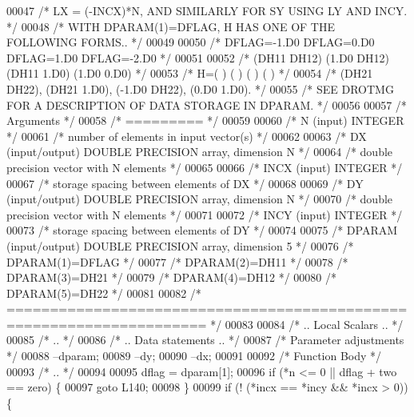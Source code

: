 \begin{DoxyCode}
00047 \textcolor{comment}{/*     LX = (-INCX)*N, AND SIMILARLY FOR SY USING LY AND INCY. */}
00048 \textcolor{comment}{/*     WITH DPARAM(1)=DFLAG, H HAS ONE OF THE FOLLOWING FORMS.. */}
00049 
00050 \textcolor{comment}{/*     DFLAG=-1.D0     DFLAG=0.D0        DFLAG=1.D0     DFLAG=-2.D0 */}
00051 
00052 \textcolor{comment}{/*       (DH11  DH12)    (1.D0  DH12)    (DH11  1.D0)    (1.D0  0.D0) */}
00053 \textcolor{comment}{/*     H=(          )    (          )    (          )    (          ) */}
00054 \textcolor{comment}{/*       (DH21  DH22),   (DH21  1.D0),   (-1.D0 DH22),   (0.D0  1.D0). */}
00055 \textcolor{comment}{/*     SEE DROTMG FOR A DESCRIPTION OF DATA STORAGE IN DPARAM. */}
00056 
00057 \textcolor{comment}{/*  Arguments */}
00058 \textcolor{comment}{/*  ========= */}
00059 
00060 \textcolor{comment}{/*  N      (input) INTEGER */}
00061 \textcolor{comment}{/*         number of elements in input vector(s) */}
00062 
00063 \textcolor{comment}{/*  DX     (input/output) DOUBLE PRECISION array, dimension N */}
00064 \textcolor{comment}{/*         double precision vector with N elements */}
00065 
00066 \textcolor{comment}{/*  INCX   (input) INTEGER */}
00067 \textcolor{comment}{/*         storage spacing between elements of DX */}
00068 
00069 \textcolor{comment}{/*  DY     (input/output) DOUBLE PRECISION array, dimension N */}
00070 \textcolor{comment}{/*         double precision vector with N elements */}
00071 
00072 \textcolor{comment}{/*  INCY   (input) INTEGER */}
00073 \textcolor{comment}{/*         storage spacing between elements of DY */}
00074 
00075 \textcolor{comment}{/*  DPARAM (input/output)  DOUBLE PRECISION array, dimension 5 */}
00076 \textcolor{comment}{/*     DPARAM(1)=DFLAG */}
00077 \textcolor{comment}{/*     DPARAM(2)=DH11 */}
00078 \textcolor{comment}{/*     DPARAM(3)=DH21 */}
00079 \textcolor{comment}{/*     DPARAM(4)=DH12 */}
00080 \textcolor{comment}{/*     DPARAM(5)=DH22 */}
00081 
00082 \textcolor{comment}{/*  ===================================================================== */}
00083 
00084 \textcolor{comment}{/*     .. Local Scalars .. */}
00085 \textcolor{comment}{/*     .. */}
00086 \textcolor{comment}{/*     .. Data statements .. */}
00087     \textcolor{comment}{/* Parameter adjustments */}
00088     --dparam;
00089     --dy;
00090     --dx;
00091 
00092     \textcolor{comment}{/* Function Body */}
00093 \textcolor{comment}{/*     .. */}
00094 
00095     dflag = dparam[1];
00096     \textcolor{keywordflow}{if} (*n <= 0 || dflag + two == zero) \{
00097     \textcolor{keywordflow}{goto} L140;
00098     \}
00099     \textcolor{keywordflow}{if} (! (*incx == *incy && *incx > 0)) \{

\end{DoxyCode}
